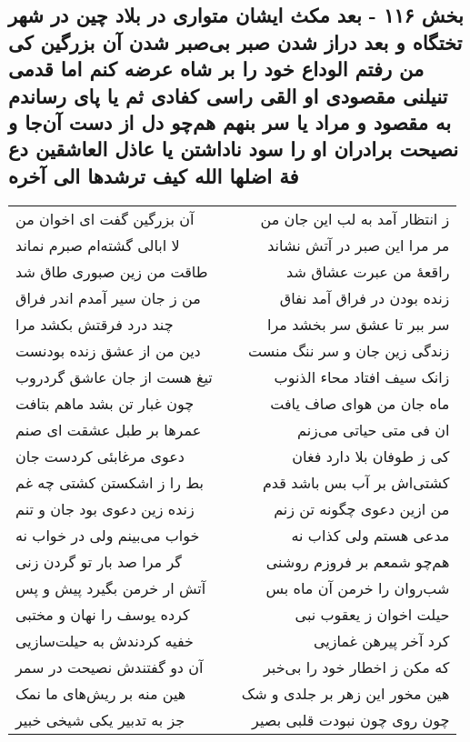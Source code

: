 \begin{center}
\section*{بخش ۱۱۶ - بعد مکث ایشان متواری در بلاد چین در شهر تختگاه و بعد دراز شدن صبر بی‌صبر شدن آن بزرگین کی من رفتم الوداع خود را بر شاه عرضه کنم اما قدمی تنیلنی مقصودی او القی راسی کفادی ثم یا پای رساندم به مقصود و مراد یا سر بنهم هم‌چو دل از دست آن‌جا و نصیحت برادران او را سود ناداشتن یا عاذل العاشقین دع فة اضلها الله کیف ترشدها الی آخره}
\label{sec:sh116}
\begin{longtable}{l p{0.5cm} r}
آن بزرگین گفت ای اخوان من
&&
ز انتظار آمد به لب این جان من
\\
لا ابالی گشته‌ام صبرم نماند
&&
مر مرا این صبر در آتش نشاند
\\
طاقت من زین صبوری طاق شد
&&
راقعهٔ من عبرت عشاق شد
\\
من ز جان سیر آمدم اندر فراق
&&
زنده بودن در فراق آمد نفاق
\\
چند درد فرقتش بکشد مرا
&&
سر ببر تا عشق سر بخشد مرا
\\
دین من از عشق زنده بودنست
&&
زندگی زین جان و سر ننگ منست
\\
تیغ هست از جان عاشق گردروب
&&
زانک سیف افتاد محاء الذنوب
\\
چون غبار تن بشد ماهم بتافت
&&
ماه جان من هوای صاف یافت
\\
عمرها بر طبل عشقت ای صنم
&&
ان فی متی حیاتی می‌زنم
\\
دعوی مرغابئی کردست جان
&&
کی ز طوفان بلا دارد فغان
\\
بط را ز اشکستن کشتی چه غم
&&
کشتی‌اش بر آب بس باشد قدم
\\
زنده زین دعوی بود جان و تنم
&&
من ازین دعوی چگونه تن زنم
\\
خواب می‌بینم ولی در خواب نه
&&
مدعی هستم ولی کذاب نه
\\
گر مرا صد بار تو گردن زنی
&&
هم‌چو شمعم بر فروزم روشنی
\\
آتش ار خرمن بگیرد پیش و پس
&&
شب‌روان را خرمن آن ماه بس
\\
کرده یوسف را نهان و مختبی
&&
حیلت اخوان ز یعقوب نبی
\\
خفیه کردندش به حیلت‌سازیی
&&
کرد آخر پیرهن غمازیی
\\
آن دو گفتندش نصیحت در سمر
&&
که مکن ز اخطار خود را بی‌خبر
\\
هین منه بر ریش‌های ما نمک
&&
هین مخور این زهر بر جلدی و شک
\\
جز به تدبیر یکی شیخی خبیر
&&
چون روی چون نبودت قلبی بصیر

\end{longtable}
\end{center}
